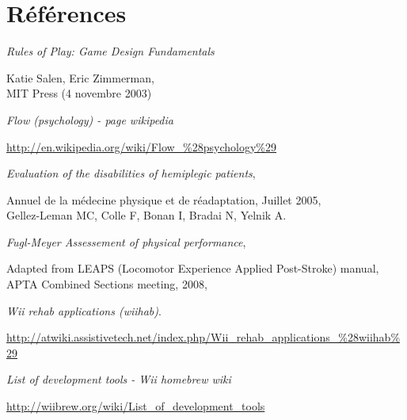 \section{Références}
\begin{thebibliography}{200}
\makeatletter
    \@clubpenalty \clubpenalty
\makeatother

\begin{footnotesize}

  \emph{Rules of Play: Game Design Fundamentals}\\
  \begin{tiny}
  Katie Salen, Eric Zimmerman,\\
  MIT Press (4 novembre 2003)
  \end{tiny}

  \emph{Flow (psychology) - page wikipedia}\\
  \begin{tiny}
  \url{http://en.wikipedia.org/wiki/Flow_\%28psychology\%29}
  \end{tiny}
  
  \emph{Evaluation of the disabilities of hemiplegic patients},\\
  \begin{tiny}
  Annuel de la médecine physique et de réadaptation, Juillet 2005,\\
  Gellez-Leman MC, Colle F, Bonan I, Bradai N, Yelnik A.\\
  \end{tiny}
  
  \emph{Fugl-Meyer Assessement of physical performance},\\
  \begin{tiny}
  Adapted from LEAPS (Locomotor Experience Applied Post-Stroke) manual,\\
  APTA Combined Sections meeting, 2008,\\
  \end{tiny}

  \emph{Wii rehab applications (wiihab)}.\\
  \begin{tiny}
  \url{http://atwiki.assistivetech.net/index.php/Wii_rehab_applications_\%28wiihab\%29}
  \end{tiny}
  
  \emph{List of development tools - Wii homebrew wiki}\\
  \begin{tiny}
  \url{http://wiibrew.org/wiki/List_of_development_tools}
  \end{tiny}
  

\end{footnotesize}
\end{thebibliography}
